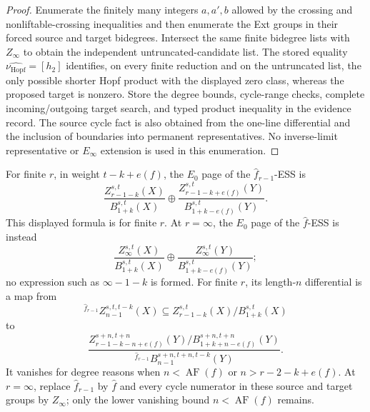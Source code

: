 \begin{proof}
  Enumerate the finitely many integers $a,a',b$ allowed by the crossing and
  nonliftable-crossing inequalities and then enumerate the Ext groups in their
  forced source and target bidegrees.  Intersect the same finite bidegree lists
  with $Z_\infty$ to obtain the independent untruncated-candidate list.  The
  stored equality $\widehat{\nu_{\mathrm{Hopf}}}=[h_2]$ identifies, on every
  finite reduction and on the untruncated list, the only possible shorter Hopf
  product with the displayed zero class, whereas the proposed target is
  nonzero.  Store
  the degree bounds, cycle-range checks, complete incoming/outgoing target
  search, and typed product inequality in the evidence record.  The source cycle fact is
  also obtained from the one-line differential and the inclusion of boundaries
  into permanent representatives.  No inverse-limit representative or
  $E_\infty$ extension is used in this enumeration.
\end{proof}

\begin{proposition}
  \label{prop:hat-map-ess-e0}
  \notready
  For finite $r$, in weight $t-k+e(f)$, the $E_0$ page of the
  $\widehat f_{r-1}$-ESS is
  \[
  \frac{Z_{r-1-k}^{s,t}(X)}{B_{1+k}^{s,t}(X)}\oplus
  \frac{Z_{r-1-k+e(f)}^{s,t}(Y)}{B_{1+k-e(f)}^{s,t}(Y)}.
  \]
  This displayed formula is for finite $r$.  At $r=\infty$, the $E_0$ page
  of the $\widehat f$-ESS is instead
  \[
  \frac{Z_\infty^{s,t}(X)}{B_{1+k}^{s,t}(X)}\oplus
  \frac{Z_\infty^{s,t}(Y)}{B_{1+k-e(f)}^{s,t}(Y)};
  \]
  no expression such as $\infty-1-k$ is formed.
  For finite $r$, its length-$n$ differential is a map from
  \[
    {}^{\widehat f_{r-1}}\!Z_{n-1}^{s,t,t-k}(X)
      \subseteq Z_{r-1-k}^{s,t}(X)/B_{1+k}^{s,t}(X)
  \]
  to
  \[
    \frac{Z_{r-1-k-n+e(f)}^{s+n,t+n}(Y)/
      B_{1+k+n-e(f)}^{s+n,t+n}(Y)}
    {{}^{\widehat f_{r-1}}\!B_{n-1}^{s+n,t+n,t-k}(Y)}.
  \]
  It vanishes for degree reasons when $n<\operatorname{AF}(f)$ or
  $n>r-2-k+e(f)$.
  At $r=\infty$, replace $\widehat f_{r-1}$ by $\widehat f$ and every cycle
  numerator in these source and target groups by $Z_\infty$; only the lower
  vanishing bound $n<\operatorname{AF}(f)$ remains.
\end{proposition}

